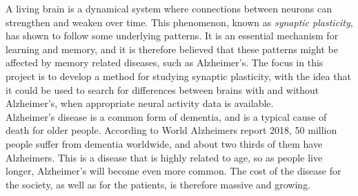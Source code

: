 


A living brain is a dynamical system where connections between neurons can strengthen and weaken over time. This phenomenon, known as \textit{synaptic plasticity}, has shown to follow some underlying patterns. It is an essential mechanism for learning and memory, and it is therefore believed that these patterns might be affected by memory related diseases, such as Alzheimer's. The focus in this project is to develop a method for studying synaptic plasticity, with the idea that it could be used to search for differences between brains with and without Alzheimer's, when appropriate neural activity data is available.  \\

Alzheimer's disease is a common form of dementia, and is a typical cause of death for older people. According to World Alzheimers report 2018, 50 million people suffer from dementia worldwide, and about two thirds of them have Alzheimers. This is a disease that is highly related to age, so as people live longer, Alzheimer’s will become even more common. The cost of the disease for the society, as well as for the patients, is therefore massive and growing.

